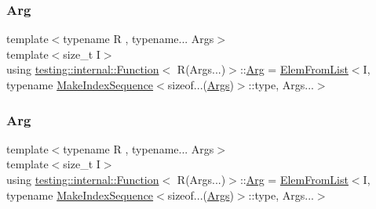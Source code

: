 \subsubsection{\texorpdfstring{Arg}{Arg}\hspace{0.1cm}{\footnotesize\ttfamily [1/2]}}
{\footnotesize\ttfamily template$<$typename R , typename... Args$>$ \\
template$<$size\+\_\+t I$>$ \\
using \mbox{\hyperlink{structtesting_1_1internal_1_1_function}{testing\+::internal\+::\+Function}}$<$ R(Args...)$>$\+::\mbox{\hyperlink{structtesting_1_1internal_1_1_function_3_01_r_07_args_8_8_8_08_4_a2f31086b21cd71eb6c855b2835c16878}{Arg}} =  \mbox{\hyperlink{structtesting_1_1internal_1_1_elem_from_list}{Elem\+From\+List}}$<$I, typename \mbox{\hyperlink{structtesting_1_1internal_1_1_make_index_sequence}{Make\+Index\+Sequence}}$<$sizeof...(\mbox{\hyperlink{namespacetesting_aaca153f67b689b8b9d5b8c67ecf8cee4}{Args}})$>$\+::type, Args...$>$}

\mbox{\label{structtesting_1_1internal_1_1_function_3_01_r_07_args_8_8_8_08_4_a2f31086b21cd71eb6c855b2835c16878}} 
\subsubsection{\texorpdfstring{Arg}{Arg}\hspace{0.1cm}{\footnotesize\ttfamily [2/2]}}
{\footnotesize\ttfamily template$<$typename R , typename... Args$>$ \\
template$<$size\+\_\+t I$>$ \\
using \mbox{\hyperlink{structtesting_1_1internal_1_1_function}{testing\+::internal\+::\+Function}}$<$ R(Args...)$>$\+::\mbox{\hyperlink{structtesting_1_1internal_1_1_function_3_01_r_07_args_8_8_8_08_4_a2f31086b21cd71eb6c855b2835c16878}{Arg}} =  \mbox{\hyperlink{structtesting_1_1internal_1_1_elem_from_list}{Elem\+From\+List}}$<$I, typename \mbox{\hyperlink{structtesting_1_1internal_1_1_make_index_sequence}{Make\+Index\+Sequence}}$<$sizeof...(\mbox{\hyperlink{namespacetesting_aaca153f67b689b8b9d5b8c67ecf8cee4}{Args}})$>$\+::type, Args...$>$}

\mbox{\label{structtesting_1_1internal_1_1_function_3_01_r_07_args_8_8_8_08_4_aa1b4dca988b45fea2307518af5ac8a09}} 
